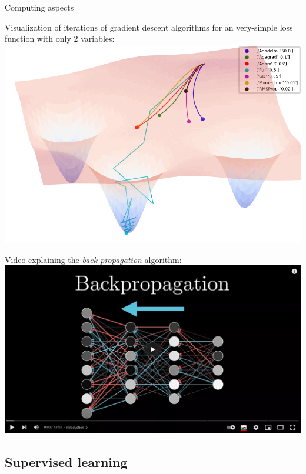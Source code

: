 \documentclass[10pt,serif,mathserif,compress,hyperref={colorlinks}]{beamer}
\begin{document}
\begin{frame}{Computing aspects}

  {\small Visualization of iterations of gradient descent algorithms for an very-simple loss function with only 2 variables:}\\[2mm]
  \hspace*{25mm}\href{https://github.com/Jaewan-Yun/optimizer-visualization/blob/master/figures/movie9.gif}{\includegraphics[width=.45\textwidth]{images/adam_plot3D_animated.png}}\\[-2mm]
  
  \medskip
      {\small Video explaining the {\em back propagation} algorithm:}\\
      \hspace*{30mm}\href{https://www.3blue1brown.com/lessons/backpropagation}{\includegraphics[width=.35\textwidth]{images/video-BackPropagation.png}}
\end{frame}

\subsection{Supervised learning}
\end{document}
